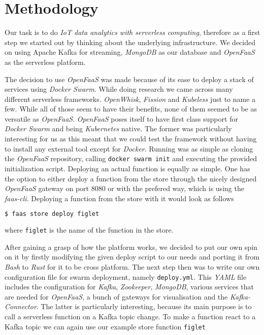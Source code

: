 \section{Methodology}


Our task is to do \textit{IoT data analytics with serverless computing}, therefore as a first step
we started out by thinking about the underlying infrastructure. We decided on using Apache Kafka for
streaming, \textit{MongoDB} as our database and \textit{OpenFaaS} as the serverless platform.

The decision to use \textit{OpenFaaS} was made because of its ease to deploy a stack of services
using \textit{Docker Swarm}. While doing research we came across many different serverless
frameworks. \textit{OpenWhisk}, \textit{Fission} and \textit{Kubeless} just to name a few. While all
of those seem to have their benefits, none of them seemed to be as versatile as \textit{OpenFaaS}.
\textit{OpenFaaS} poses itself to have first class support for \textit{Docker Swarm} and being
\textit{Kubernetes} native. The former was particularly interesting for us as this meant that we
could test the framework without having to install any external tool except for  \textit{Docker}.
Running was as simple as cloning the \textit{OpenFaaS} repository, calling \texttt{docker swarm
init} and executing the provided initialization script. Deploying an actual function is equally as
simple. One has the option to either deploy a function from the store through the nicely designed
\textit{OpenFaaS} gateway on port 8080 or with the prefered way, which is using the
\textit{faas-cli}. Deploying a function from the store with it would look as follows

\begin{lstlisting}[language=bash]
$ faas store deploy figlet
\end{lstlisting}

where \texttt{figlet} is the name of the function in the store.

After gaining a grasp of how the platform works, we decided to put our own spin on it by firstly
modifying the given deploy script to our needs and porting it from \textit{Bash} to \textit{Rust}
for it to be cross platform. The next step then was to write our own configuration file for swarm
deployment, namely \texttt{deploy.yml}. This \textit{YAML} file includes the configuration for
\textit{Kafka}, \textit{Zookeeper}, \textit{MongoDB}, various services that are needed for
\textit{OpenFaaS}, a bunch of gateways for visualisation and the \textit{Kafka-Connector}. The
latter is particularly interesting, because its main purpose is to call a serverless function on a
Kafka topic change. To make a function react to a Kafka topic we can again use our example store
function \texttt{figlet}

